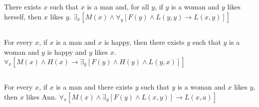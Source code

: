 \documentclass{article}
\begin{document}
\subsection{}
There exists $x$ such that $x$ is a man and, for all $y$, if $y$ is a woman and $y$ likes herself, then $x$ likes $y$.
\newline
$\exists_x[M(x) \wedge \forall_y[F(y) \wedge L(y, y) \to L(x, y)]]$

\subsection{}
For every $x$, if $x$ is a man and $x$ is happy, then there exists $y$ such that $y$ is a woman and $y$ is happy and $y$ likes $x$.
\newline
$\forall_x[M(x) \wedge H(x) \to \exists_y[F(y) \wedge H(y) \wedge L(y, x)]]$

\subsection{}
For every $x$, if $x$ is a man and there exists $y$ such that $y$ is a woman and $x$ likes $y$, then $x$ likes Ann.
\newline
$\forall_x[M(x) \wedge \exists_y[F(y) \wedge L(x, y)] \to L(x, a)]$
\end{document}
